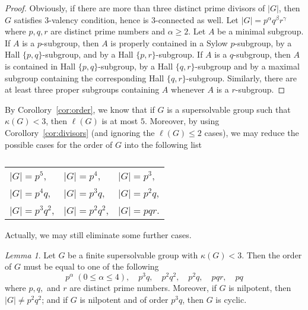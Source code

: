 \documentclass[a4paper,12pt]{article}
\theoremstyle{definition}
\theoremstyle{remark}
\theoremstyle{theorem}
\newtheorem{lem}[theorem]{Lemma}
\begin{document}
\begin{proof}
  Obviously, if there are more than three distinct prime divisors of
  $|G|$, then $G$ satisfies $3$-valency condition, hence is
  $3$-connected as well. Let $|G|=p^{\alpha}q^{\beta}r^{\gamma}$ where
  $p,q,r$ are distinct prime numbers and $\alpha\geq 2$. Let $A$ be a
  minimal subgroup. If $A$ is a $p$-subgroup, then $A$ is properly
  contained in a Sylow $p$-subgroup, by a Hall $\{p,q\}$-subgroup, and
  by a Hall $\{p,r\}$-subgroup. If $A$ is a $q$-subgroup, then $A$ is
  contained in Hall $\{p,q\}$-subgroup, by a Hall $\{q,r\}$-subgroup
  and by a maximal subgroup containing the corresponding Hall
  $\{q,r\}$-subgroup. Similarly, there are at least three proper
  subgroups containing $A$ whenever $A$ is a $r$-subgroup.
\end{proof}

By Corollory~\ref{cor:order}, we know that if $G$ is a supersolvable group such that $\kappa(G)<3$, then $\ell(G)$ is at most $5$. Moreover, by using Corollory~\ref{cor:divisors} (and ignoring the $\ell(G)\leq 2$ cases), we may reduce the possible cases for the order of $G$ into the following list

\begin{table}[h!]
\centering
\caption{}
\label{table:1}
\begin{tabular}{lll}
  $ \vert G \vert = p^5 $,     & $ \vert G \vert = p^4 $,    & $ \vert G \vert = p^3 $,    \\
  $ \vert G \vert = p^4q $,    & $ \vert G \vert = p^3q $,   & $ \vert G \vert = p^2q $,   \\
  $ \vert G \vert = p^3q^2 $,  & $ \vert G \vert = p^2q^2 $, & $ \vert G \vert = pqr $.    \\
\end{tabular}
\end{table}

Actually, we may still eliminate some further cases.

\begin{lem}\label{lem:order}
  Let $G$ be a finite supersolvable group with $\kappa(G)<3$. Then the
  order of $G$ must be equal to one of the following
  $$ p^{\alpha}\; (0\leq \alpha \leq 4), \quad p^3q, \quad p^2q^2,
  \quad p^2q,\quad pqr, \quad pq $$
  where $p,q,$ and $r$ are distinct prime numbers. Moreover, if $G$ is
  nilpotent, then $|G|\neq p^2q^2$; and if $G$ is nilpotent and of
  order $p^3q$, then $G$ is cyclic.
\end{lem}
\end{document}
